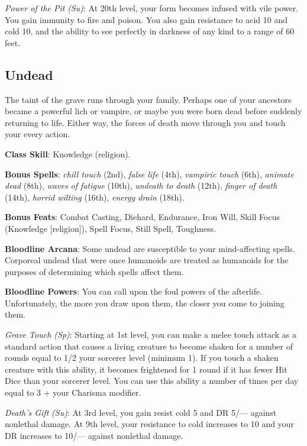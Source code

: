 \textit{Power of the Pit} \textit{(Su)}: At 20th level, your form becomes infused with vile power. You gain immunity to fire and 
poison. You also gain resistance to acid 10 and cold 10, and the ability to see perfectly in darkness of any kind to a range of 60 feet.
				
\subsection{Undead}

				
The taint of the grave runs through your family. Perhaps one of your ancestors became a powerful lich or vampire, or maybe you were
born dead before suddenly returning to life. Either way, the forces of death move through you and touch your every action.
				
\textbf{Class Skill}: Knowledge (religion).
				
\textbf{Bonus Spells}: \textit{chill touch} (2nd), \textit{false life} (4th), \textit{vampiric touch} (6th),
\textit{animate dead} (8th), \textit{waves of fatigue} (10th), \textit{undeath to death} (12th), \textit{finger of death} (14th),
\textit{horrid wilting} (16th), \textit{energy drain} (18th).
				
\textbf{Bonus Feats}: Combat Casting, Diehard, Endurance, Iron Will, Skill Focus (Knowledge \mbox{$[$}religion\mbox{$]$}), Spell Focus,
Still Spell, Toughness.
				
\textbf{Bloodline Arcana}: Some undead are susceptible to your mind-affecting spells. Corporeal undead that were once humanoids are
treated as humanoids for the purposes of determining which spells affect them.
				
\textbf{Bloodline Powers}: You can call upon the foul powers of the afterlife. Unfortunately, the more you draw upon them, the closer
you come to joining them.
				
\textit{Grave Touch (Sp)}: Starting at 1st level, you can make a melee touch attack as a standard action that causes a living creature
to become shaken for a number of rounds equal to 1/2 your sorcerer level (minimum 1). If you touch a shaken creature with this ability,
it becomes frightened for 1 round if it has fewer Hit Dice than your sorcerer level. You can use this ability a number of times per 
day equal to 3 + your Charisma modifier.
				
\textit{Death's Gift} \textit{(Su)}: At 3rd level, you gain resist cold 5 and DR 5/--- against nonlethal damage. At 9th level, your
resistance to cold increases to 10 and your DR increases to 10/--- against nonlethal damage.
				
